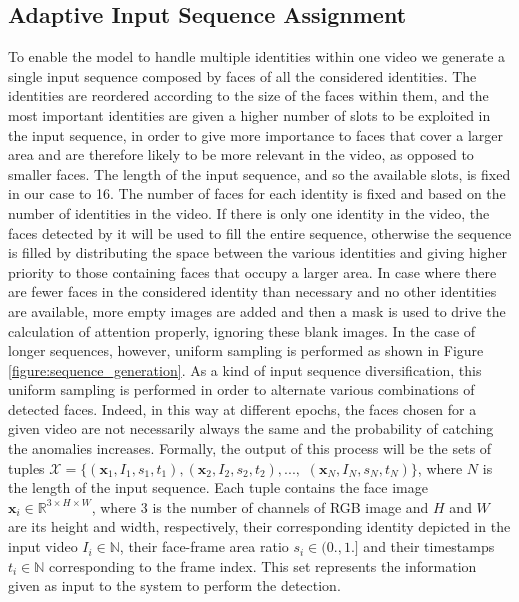 \documentclass[10pt,twocolumn,letterpaper]{article}
\begin{document}
\subsection{Adaptive Input Sequence Assignment}
\label{sec:sequence_assignment}
To enable the model to handle multiple identities within one video we generate a single input sequence composed by faces of all the considered identities. The identities are reordered according to the size of the faces within them, and the most important identities are given a higher number of slots to be exploited in the input sequence, in order to give more importance to faces that cover a larger area and are therefore likely to be more relevant in the video, as opposed to smaller faces. The length of the input sequence, and so the available slots, is fixed in our case to 16.
The number of faces for each identity is fixed and based on the number of identities in the video. If there is only one identity in the video, the faces detected by it will be used to fill the entire sequence, otherwise the sequence is filled by distributing the space between the various identities and giving higher priority to those containing faces that occupy a larger area. In case where there are fewer faces in the considered identity than necessary and no other identities are available, more empty images are added and then a mask is used to drive the calculation of attention properly, ignoring these blank images. In the case of longer sequences, however, uniform sampling is performed as shown in Figure \ref{figure:sequence_generation}. 
As a kind of input sequence diversification, this uniform sampling is performed in order to alternate various combinations of detected faces. Indeed, in this way at different epochs, the faces chosen for a given video are not necessarily always the same and the probability of catching the anomalies  increases. 
Formally, the output of this process will be the sets of tuples $\mathcal{X} = \{(\textbf{x}_1, I_1, s_1, t_1), (\textbf{x}_2, I_2, s_2, t_2), ..., $ $(\textbf{x}_N, I_N, s_N, t_N)\}$, where $N$ is the length of the input sequence. Each tuple contains the face image $\textbf{x}_i \in \mathbb{R}^{3 \times H \times W}$, where 3 is the number of channels of RGB image and $H$ and $W$ are its height and width, respectively, their corresponding identity depicted in the input video $I_i\in \mathbb{N}$, their face-frame area ratio $s_i\in (0., 1.]$ and their timestamps $t_i\in \mathbb{N}$ corresponding to the frame index. This set represents the information given as input to the system to perform the detection. 
\end{document}
